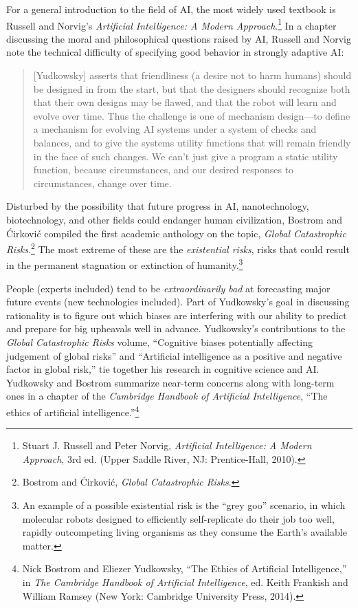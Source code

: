 {
 For a general introduction to the field of AI, the most widely
used textbook is Russell and Norvig's
\textit{Artificial Intelligence: A Modern Approach}.\footnote{Stuart J. Russell and Peter Norvig, \textit{Artificial
Intelligence: A Modern Approach}, 3rd ed. (Upper Saddle River, NJ:
Prentice-Hall, 2010).}
In a chapter discussing the moral and philosophical questions raised by
AI, Russell and Norvig note the technical difficulty of specifying good
behavior in strongly adaptive AI:}

\begin{quotation}
{
 [Yudkowsky] asserts that friendliness (a desire not to harm
humans) should be designed in from the start, but that the designers
should recognize both that their own designs may be flawed, and that
the robot will learn and evolve over time. Thus the challenge is one of
mechanism design---to define a mechanism for evolving AI systems under
a system of checks and balances, and to give the systems utility
functions that will remain friendly in the face of such changes. We
can't just give a program a static utility function,
because circumstances, and our desired responses to circumstances,
change over time.}
\end{quotation}

{
 Disturbed by the possibility that future progress in AI,
nanotechnology, biotechnology, and other fields could endanger human
civilization, Bostrom and \'Cirkovi\'c compiled the first academic
anthology on the topic, \textit{Global Catastrophic
Risks}.\footnote{Bostrom and \'Cirkovi\'c, \textit{Global Catastrophic Risks}.} The most extreme of these are the
\textit{existential risks}, risks that could result in the permanent
stagnation or extinction of humanity.\footnote{An example of a possible existential risk is the
``grey goo'' scenario, in which
molecular robots designed to efficiently self-replicate do their job
too well, rapidly outcompeting living organisms as they consume the
Earth's available matter.}}

{
 People (experts included) tend to be \textit{extraordinarily bad}
at forecasting major future events (new technologies included). Part of
Yudkowsky's goal in discussing rationality is to figure
out which biases are interfering with our ability to predict and
prepare for big upheavals well in advance. Yudkowsky's
contributions to the \textit{Global Catastrophic Risks} volume,
``Cognitive biases potentially affecting judgement of
global risks'' and ``Artificial
intelligence as a positive and negative factor in global
risk,'' tie together his research in cognitive
science and AI. Yudkowsky and Bostrom summarize near-term concerns
along with long-term ones in a chapter of the \textit{Cambridge
Handbook of Artificial Intelligence}, ``The ethics of
artificial intelligence.''\footnote{Nick Bostrom and Eliezer Yudkowsky, ``The
Ethics of Artificial Intelligence,'' in \textit{The
Cambridge Handbook of Artificial Intelligence}, ed. Keith Frankish and
William Ramsey (New York: Cambridge University Press, 2014).}}

